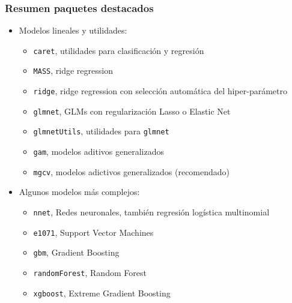 \documentclass{beamer}
\begin{document}
\begin{frame}
\frametitle{Resumen paquetes destacados}
\begin{itemize}\addtolength{\itemsep}{0.3\baselineskip}
\item Modelos lineales y utilidades:
\begin{itemize}
\item \texttt{caret}, utilidades para clasificación y regresión
\item \texttt{MASS}, ridge regression
\item \texttt{ridge}, ridge regression con selección automática del hiper-parámetro
\item \texttt{glmnet}, GLMs con regularización Lasso o Elastic Net
\item \texttt{glmnetUtils}, utilidades para \texttt{glmnet}
\item \texttt{gam}, modelos aditivos generalizados
\item \texttt{mgcv}, modelos adictivos generalizados (recomendado)
\end{itemize}
\item Algunos modelos más complejos:
\begin{itemize}
\item \texttt{nnet}, Redes neuronales, también regresión logística multinomial
\item \texttt{e1071}, Support Vector Machines
\item \texttt{gbm}, Gradient Boosting
\item \texttt{randomForest}, Random Forest
\item \texttt{xgboost}, Extreme Gradient Boosting
\end{itemize}
\end{itemize}
\end{frame}
\end{document}
